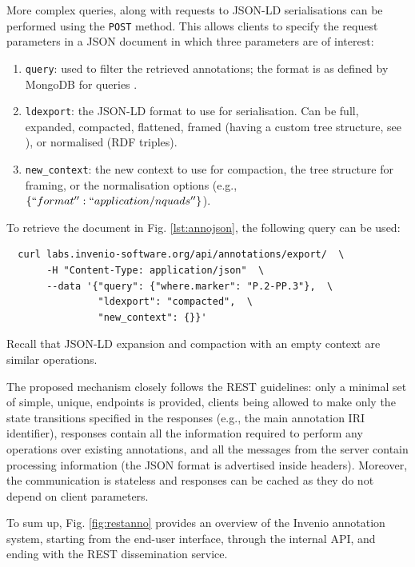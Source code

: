 More complex queries, along with requests to JSON-LD serialisations can be
performed using the \texttt{POST} method. This allows clients to specify the
request parameters in a JSON document in which three parameters are of interest:
\begin{enumerate}
  \item \texttt{query}: used to filter the retrieved annotations; the format is
                        as defined by MongoDB for queries \cite{ref:mongo}.
  \item \texttt{ldexport}: the JSON-LD format to use for serialisation. Can be
                           full, expanded, compacted, flattened, framed (having
                           a custom tree structure, see \cite{ref:jsonldframe}),
                           or normalised (RDF triples).
  \item \texttt{new\_context}: the new context to use for compaction, the tree
                               structure for framing, or the normalisation
                               options (e.g., $\{``format'': ``application/nquads''\}$).
\end{enumerate}

\newpage

To retrieve the document in Fig. \ref{lst:annojson}, the following
query can be used:
\begin{verbatim}
  curl labs.invenio-software.org/api/annotations/export/  \
       -H "Content-Type: application/json"  \
       --data '{"query": {"where.marker": "P.2-PP.3"},  \
                "ldexport": "compacted",  \
                "new_context": {}}'
\end{verbatim}
Recall that JSON-LD expansion and compaction with an empty context are similar
operations.

The proposed mechanism closely follows the REST guidelines: only a minimal set
of simple, unique, endpoints is provided, clients being allowed to make only
the state transitions specified in the responses (e.g., the main annotation IRI
identifier), responses contain all the information required to perform any
operations over existing annotations, and all the messages from the server
contain processing information (the JSON format is advertised inside headers).
Moreover, the communication is stateless and responses can be cached as they do
not depend on client parameters.

To sum up, Fig. \ref{fig:restanno} provides an overview of the Invenio
annotation system, starting from the end-user interface, through the internal
API, and ending with the REST dissemination service.

